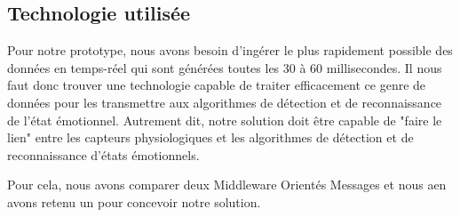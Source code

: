 \documentclass{article}
\begin{document}
	\subsection{Technologie utilisée}\label{sec:prototech}
		Pour notre prototype, nous avons besoin d'ingérer le plus rapidement possible des données en temps-réel qui sont générées toutes les 30 à 60 millisecondes.
		Il nous faut donc trouver une technologie capable de traiter efficacement ce genre de données pour les transmettre aux algorithmes de détection et de reconnaissance de l'état émotionnel.
		Autrement dit, notre solution doit être capable de "faire le lien" entre les capteurs physiologiques et les algorithmes de détection et de reconnaissance d'états émotionnels.\par
		Pour cela, nous avons comparer deux Middleware Orientés Messages et nous aen avons retenu un pour concevoir notre solution.
\end{document}
